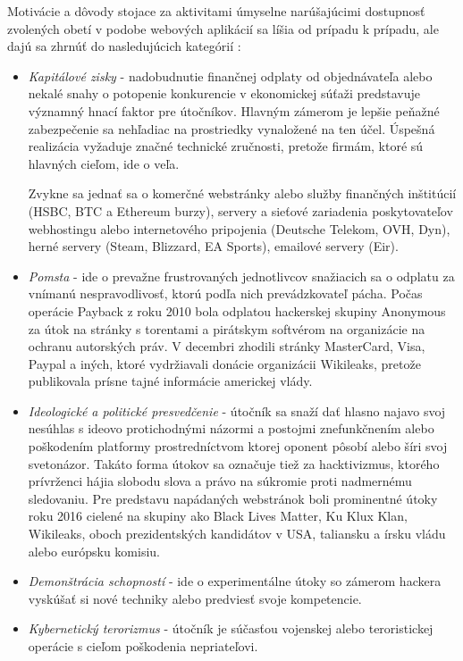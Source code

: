 \documentclass[12pt, a4paper]{article}
\begin{document}
Motivácie a dôvody stojace za aktivitami úmyselne narúšajúcimi dostupnosť zvolených obetí v podobe
webových aplikácií sa líšia od prípadu k prípadu, ale dajú sa zhrnúť do nasledujúcich kategórií 
\cite{why-attack} \cite{ddos-attacks}:
\begin{itemize}
\itemsep0em 
\item \emph{Kapitálové zisky} - nadobudnutie finančnej odplaty od objednávateľa alebo nekalé snahy o 
potopenie konkurencie v ekonomickej súťaži predstavuje významný hnací faktor pre útočníkov. 
Hlavným zámerom je lepšie peňažné zabezpečenie sa nehľadiac na prostriedky vynaložené na ten účel. 
Úspešná realizácia vyžaduje značné technické zručnosti, pretože firmám, ktoré sú hlavných cieľom,
ide o veľa. 

Zvykne sa jednať sa o komerčné webstránky alebo služby finančných inštitúcií (HSBC, BTC a 
Ethereum burzy), servery a sieťové zariadenia poskytovateľov webhostingu alebo internetového pripojenia 
(Deutsche Telekom, OVH, Dyn), herné servery (Steam, Blizzard, EA Sports), emailové servery (Eir).
\cite{why-attack}

\item \emph{Pomsta} - ide o prevažne frustrovaných jednotlivcov snažiacich sa o odplatu za vnímanú 
nespravodlivosť, ktorú podľa nich prevádzkovateľ pácha. Počas operácie Payback z roku 2010 bola odplatou
hackerskej skupiny Anonymous za útok na stránky s torentami a pirátskym softvérom na organizácie
na ochranu autorských práv. V decembri zhodili stránky MasterCard, Visa, Paypal a
iných, ktoré vydržiavali donácie organizácii Wikileaks, pretože publikovala prísne tajné informácie
americkej vlády.

\item \emph{Ideologické a politické presvedčenie} - útočník sa snaží dať hlasno najavo svoj nesúhlas s 
ideovo protichodnými názormi a postojmi znefunkčnením alebo poškodením platformy prostredníctvom ktorej 
oponent pôsobí alebo šíri svoj svetonázor. Takáto forma útokov sa označuje tiež za hacktivizmus, ktorého 
prívrženci hájia slobodu slova a právo na súkromie proti nadmernému sledovaniu. Pre predstavu napádaných 
webstránok boli prominentné útoky roku 2016 cielené na skupiny ako Black Lives Matter, Ku Klux Klan, 
Wikileaks, oboch prezidentských kandidátov v USA, taliansku a írsku vládu alebo európsku komisiu. 
\cite{why-attack}

\item \emph{Demonštrácia schopností} - ide o experimentálne útoky so zámerom hackera vyskúšať si nové techniky alebo predviesť svoje kompetencie. 
\item\emph{Kybernetický terorizmus} - útočník je súčasťou vojenskej alebo teroristickej operácie s cieľom
poškodenia nepriateľovi.
\end{itemize}
\end{document}

